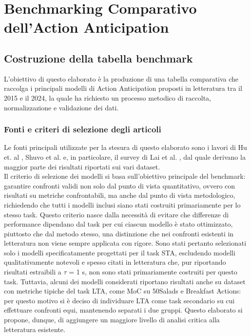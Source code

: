 \chapter{Benchmarking Comparativo dell'Action Anticipation}

\section{Costruzione della tabella benchmark}
L'obiettivo di questo elaborato è la produzione di una tabella comparativa che raccolga i principali modelli di Action Anticipation proposti in letteratura tra il 2015 e il 2024, la quale ha richiesto un processo metodico di raccolta, normalizzazione e validazione dei dati.

\subsection{Fonti e criteri di selezione degli articoli}
\label{criteri}
Le fonti principali utilizzate per la stesura di questo elaborato sono i lavori di Hu et. al \cite{hu2022online}, Shuvo et al. \cite{shuvo2025deep} e, in particolare, il survey di Lai et al. \cite{lai2024human}, dal quale derivano la maggior parte dei risultati riportati sui vari dataset. \\
Il criterio di selezione dei modelli si basa sull'obiettivo principale del benchmark: garantire confronti validi non solo dal punto di vista quantitativo, ovvero con risultati su metriche confrontabili, ma anche dal punto di vista metodologico, richiedendo che tutti i modelli inclusi siano stati costruiti primariamente per lo stesso task.
Questo criterio nasce dalla necessità di evitare che differenze di performance dipendano dal task per cui ciascun modello è stato ottimizzato, piuttosto che dal metodo stesso, una distinzione che nei confronti esistenti in letteratura non viene sempre applicata con rigore. Sono stati pertanto selezionati solo i modelli specificatamente progettati per il task STA, escludendo modelli qualitativamente notevoli e spesso citati in letteratura che, pur riportando risultati estraibili a  $\tau$ = 1 s, non sono stati primariamente costruiti per questo task. Tuttavia, alcuni dei modelli considerati riportano risultati anche su dataset con metriche tipiche del task LTA, come MoC su 50Salads e Breakfast Actions: per questo motivo si è deciso di individuare LTA come task secondario su cui effettuare confronti equi, mantenendo separati i due gruppi.
Questo elaborato si propone, dunque, di aggiungere un maggiore livello di analisi critica alla letteratura esistente. 

